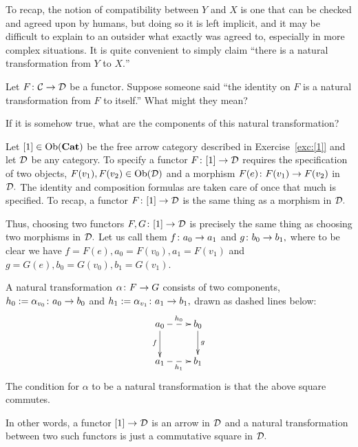 \documentclass[CT4S-EN-RU]{subfiles}
\begin{document}
\begin{applicationENG}
To recap, the notion of compatibility between $Y$ and $X$ is one that can be checked and agreed upon by humans, but doing so it is left implicit, and it may be difficult to explain to an outsider what exactly was agreed to, especially in more complex situations. It is quite convenient to simply claim “there is a natural transformation from $Y$ to $X.$”
\end{applicationENG}

\begin{applicationRUS}\label{app:change of fsm}
\end{applicationRUS}

\begin{exerciseENG}\label{exc:id nat trans}
Let $F\colon\mathcal{C}\rightarrow\mathcal{D}$ be a functor. Suppose someone said “the identity on $F$ is a natural transformation from $F$ to itself.” \sexc What might they mean?
\item If it is somehow true, what are the components of this natural transformation?
\endsexc
\end{exerciseENG}

\begin{exerciseRUS}\label{exc:id nat trans}
\end{exerciseRUS}

\begin{exampleENG}
Let $[1]\in\textnormal{Ob}({\mathbf{Cat}})$ be the free arrow category described in Exercise~\ref{exc:[1]} and let $\mathcal{D}$ be any category. To specify a functor $F\colon[1]\rightarrow\mathcal{D}$ requires the specification of two objects, $F(v_1), F(v_2)\in\textnormal{Ob}(\mathcal{D})$ and a morphism $F(e)\colon F(v_1)\rightarrow F(v_2)$ in $\mathcal{D}.$ The identity and composition formulas are taken care of once that much is specified. To recap, a functor $F\colon[1]\rightarrow\mathcal{D}$ is the same thing as a morphism in $\mathcal{D}.$

Thus, choosing two functors $F,G\colon[1]\rightarrow\mathcal{D}$ is precisely the same thing as choosing two morphisms in $\mathcal{D}.$ Let us call them $f\colon a_0\rightarrow a_1$ and $g\colon b_0\rightarrow b_1,$ where to be clear we have $f=F(e), a_0=F(v_0), a_1=F(v_1)$ and $g=G(e), b_0=G(v_0), b_1=G(v_1).$ 

A natural transformation $\alpha\colon F\rightarrow G$ consists of two components, $h_0:=\alpha_{v_0}\colon a_0\rightarrow b_0$ and $h_1:=\alpha_{v_1}\colon a_1\rightarrow b_1,$ drawn as dashed lines below:
$$\xymatrix{a_0\ar@{-->}[r]^{h_0}\ar[d]_f&b_0\ar[d]^{g}\\a_1\ar@{-->}[r]_{h_1}&b_1}$$
The condition for $\alpha$ to be a natural transformation is that the above square commutes. 

In other words, a functor $[1]\rightarrow\mathcal{D}$ is an arrow in $\mathcal{D}$ and a natural transformation between two such functors is just a commutative square in $\mathcal{D}.$
\end{exampleENG}
\end{document}
